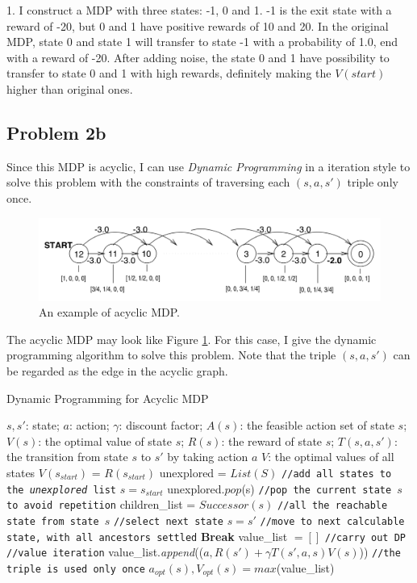 \documentclass[paper=a4, fontsize=10pt]{scrartcl} %
\numberwithin{equation}{section} %
\numberwithin{figure}{section} %
\numberwithin{table}{section} %
\begin{document}
\begin{spacing}{1.}
I construct a MDP with three states: -1, 0 and 1. -1 is the exit state with a reward of -20, but 0 and 1 have positive rewards of 10 and 20. In the original MDP, state 0 and state 1 will transfer to state -1 with a probability of 1.0, end with a reward of -20. After adding noise, the state 0 and 1 have possibility to transfer to state 0 and 1 with high rewards, definitely making the $V(start)$ higher than original ones.

\subsection{Problem 2b}
Since this MDP is acyclic, I can use \textit{Dynamic Programming} in a iteration style to solve this problem with the constraints of traversing each $(s, a, s')$ triple only once.

\begin{figure}[!htp]
\centering 
\includegraphics[width=10 cm]{picture/acyclic_MDP}
\caption{An example of acyclic MDP.}
\label{fig:acy_MDP} 
\end{figure}

The acyclic MDP may look like Figure \ref{fig:acy_MDP}. For this case, I give the dynamic programming algorithm to solve this problem. Note that the triple $(s, a, s')$ can be regarded as the edge in the acyclic graph.

\begin{algorithm}[h]
\caption{Dynamic Programming for Acyclic MDP} 
\label{alg::DP_acy} 
\begin{algorithmic}[1]
{
\Require
$s, s'$: state;
$a$: action;
$\gamma$: discount factor;
$A(s)$: the feasible action set of state $s$;
$V(s)$: the optimal value of state $s$;
$R(s)$: the reward of state $s$;
$T(s, a, s')$: the transition from state $s$ to $s'$ by taking action $a$
\Ensure
$V$: the optimal values of all states
\State $V(s_{start})$ = $R(s_{start})$
\State unexplored = $List(S)$    \texttt{//add all states to the \textit{unexplored} list}
\State $s = s_{start}$
	\State unexplored.$pop$(s)    \texttt{//pop the current state $s$ to avoid repetition}
	\State children\_list = $Successor(s)$    \texttt{//all the reachable state from state $s$}
	    \texttt{//select next state}
			\State $s = s'$    \texttt{//move to next calculable state, with all ancestors settled}
			\State \textbf{Break}
		\EndIf
	\EndFor
	\State value\_list $= [ ]$    \texttt{//carry out DP}
	    \texttt{//value iteration}
		\State value\_list.\textit{append}(($a, R(s') + \gamma T(s', a, s)V(s)$)) \texttt{//the triple is used only once}
	\EndFor
	\State $a_{opt}(s), V_{opt}(s) = max$(value\_list)
\EndWhile
}
\end{algorithmic} 
\end{algorithm}


\end{spacing}
\end{document}
